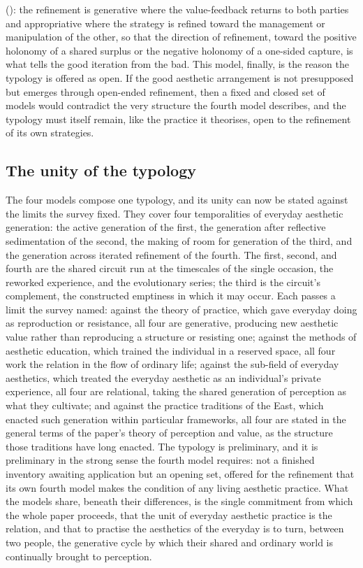 (): the refinement is generative where the value-feedback returns to both parties and appropriative where the strategy is refined toward the management or manipulation of the other, so that the direction of refinement, toward the positive holonomy of a shared surplus or the negative holonomy of a one-sided capture, is what tells the good iteration from the bad. This model, finally, is the reason the typology is offered as open. If the good aesthetic arrangement is not presupposed but emerges through open-ended refinement, then a fixed and closed set of models would contradict the very structure the fourth model describes, and the typology must itself remain, like the practice it theorises, open to the refinement of its own strategies.

\subsection{The unity of the typology}
\label{p23:sub:typ-unity}

The four models compose one typology, and its unity can now be stated against the limits the survey fixed. They cover four temporalities of everyday aesthetic generation: the active generation of the first, the generation after reflective sedimentation of the second, the making of room for generation of the third, and the generation across iterated refinement of the fourth. The first, second, and fourth are the shared circuit run at the timescales of the single occasion, the reworked experience, and the evolutionary series; the third is the circuit's complement, the constructed emptiness in which it may occur. Each passes a limit the survey named: against the theory of practice, which gave everyday doing as reproduction or resistance, all four are generative, producing new aesthetic value rather than reproducing a structure or resisting one; against the methods of aesthetic education, which trained the individual in a reserved space, all four work the relation in the flow of ordinary life; against the sub-field of everyday aesthetics, which treated the everyday aesthetic as an individual's private experience, all four are relational, taking the shared generation of perception as what they cultivate; and against the practice traditions of the East, which enacted such generation within particular frameworks, all four are stated in the general terms of the paper's theory of perception and value, as the structure those traditions have long enacted. The typology is preliminary, and it is preliminary in the strong sense the fourth model requires: not a finished inventory awaiting application but an opening set, offered for the refinement that its own fourth model makes the condition of any living aesthetic practice. What the models share, beneath their differences, is the single commitment from which the whole paper proceeds, that the unit of everyday aesthetic practice is the relation, and that to practise the aesthetics of the everyday is to turn, between two people, the generative cycle by which their shared and ordinary world is continually brought to perception.
